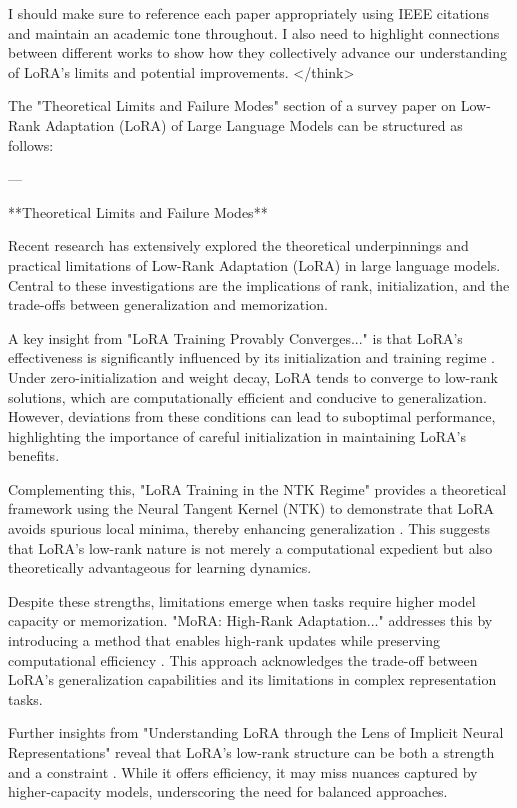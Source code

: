 \documentclass[conference]{IEEEtran}
\begin{document}
I should make sure to reference each paper appropriately using IEEE citations and maintain an academic tone throughout. I also need to highlight connections between different works to show how they collectively advance our understanding of LoRA's limits and potential improvements.
</think>

The "Theoretical Limits and Failure Modes" section of a survey paper on Low-Rank Adaptation (LoRA) of Large Language Models can be structured as follows:

---

**Theoretical Limits and Failure Modes**

Recent research has extensively explored the theoretical underpinnings and practical limitations of Low-Rank Adaptation (LoRA) in large language models. Central to these investigations are the implications of rank, initialization, and the trade-offs between generalization and memorization.

A key insight from "LoRA Training Provably Converges..." is that LoRA's effectiveness is significantly influenced by its initialization and training regime \cite{bX}. Under zero-initialization and weight decay, LoRA tends to converge to low-rank solutions, which are computationally efficient and conducive to generalization. However, deviations from these conditions can lead to suboptimal performance, highlighting the importance of careful initialization in maintaining LoRA's benefits.

Complementing this, "LoRA Training in the NTK Regime" provides a theoretical framework using the Neural Tangent Kernel (NTK) to demonstrate that LoRA avoids spurious local minima, thereby enhancing generalization \cite{bX}. This suggests that LoRA's low-rank nature is not merely a computational expedient but also theoretically advantageous for learning dynamics.

Despite these strengths, limitations emerge when tasks require higher model capacity or memorization. "MoRA: High-Rank Adaptation..." addresses this by introducing a method that enables high-rank updates while preserving computational efficiency \cite{bX}. This approach acknowledges the trade-off between LoRA's generalization capabilities and its limitations in complex representation tasks.

Further insights from "Understanding LoRA through the Lens of Implicit Neural Representations" reveal that LoRA's low-rank structure can be both a strength and a constraint \cite{bX}. While it offers efficiency, it may miss nuances captured by higher-capacity models, underscoring the need for balanced approaches.
\end{document}
